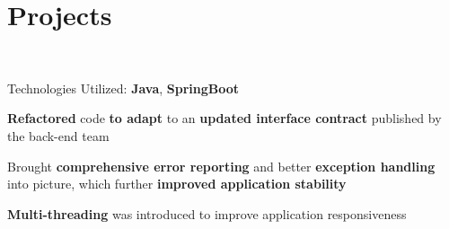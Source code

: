 \documentclass[]{deedy-resume-openfont}
\begin{document}
\begin{minipage}[t]{0.66\textwidth}

\section{Projects}

\\
\begin{tightemize}
\item Technologies Utilized: \textbf{Java}, \textbf{SpringBoot}
\item \textbf{Refactored} code \textbf{to adapt} to an \textbf{updated interface contract} published by the back-end team
\item Brought \textbf{comprehensive error reporting} and better \textbf{exception handling} into picture, which further \textbf{improved application stability}
\item \textbf{Multi-threading} was introduced to improve application responsiveness
\end{tightemize}
\sectionsep



\end{minipage}
\end{document}
